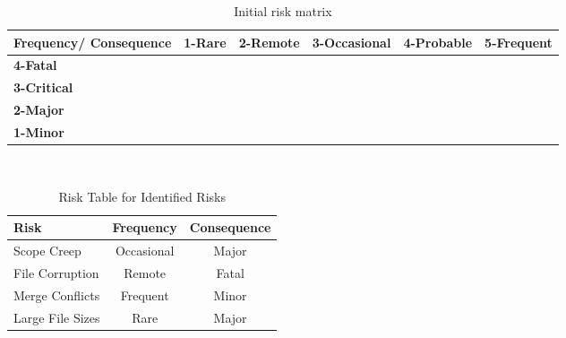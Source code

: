 \begin{table}[h]
\centering
\scriptsize
\caption{Initial risk matrix}
\begin{tabular}{|p{2cm}|p{2cm}|p{2cm}| p{2cm} |p{2cm}| p{2cm}|}
\hline \bf Frequency/ Consequence & \bf 1-Rare & \bf 2-Remote & \bf 3-Occasional & \bf 4-Probable & \bf 5-Frequent\\ [10pt]

\hline \bf 4-Fatal & \cellcolor{yellow!50} & \cellcolor{red!50} & \cellcolor{red!50} & \cellcolor{red!50} &\cellcolor{red!50} \\ [10pt]

\hline \bf 3-Critical &\cellcolor{green!50} & \cellcolor{yellow!50} & \cellcolor{yellow!50} & \cellcolor{red!50} &\cellcolor{red!50} \\ [10pt]

\hline \bf 2-Major & \cellcolor{green!50} & \cellcolor{green!50} & \cellcolor{yellow!50} &\cellcolor{yellow!50} &\cellcolor{red!50} \\ [10pt]

\hline \bf 1-Minor & \cellcolor{green!50} & \cellcolor{green!50} & \cellcolor{green!50} &\cellcolor{yellow!50} &\cellcolor{yellow!50} \\ [10pt]
\hline
\end{tabular} \\
\label{tab:ProjRisks}
\end{table}

\begin{table}[h]
\centering
\caption{Risk Table for Identified Risks}
\begin{tabular}{|l|c|c|}
\hline
\textbf{Risk}                           & \textbf{Frequency} & \textbf{Consequence} \\
\hline
\rowcolor{yellow!50} Scope Creep        & Occasional        & Major                 \\
\hline
\rowcolor{red!50} File Corruption       & Remote            & Fatal                 \\
\hline
\rowcolor{yellow!50} Merge Conflicts    & Frequent          & Minor               \\
\hline
\rowcolor{green!50} Large File Sizes   & Rare              & Major                 \\
\hline
\end{tabular}
\label{tab:ProjRisks}
\end{table}


